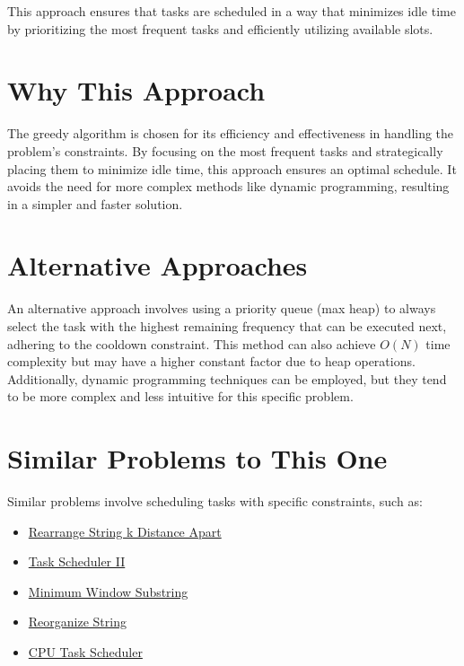 This approach ensures that tasks are scheduled in a way that minimizes idle time by prioritizing the most frequent tasks and efficiently utilizing available slots.

\section*{Why This Approach}

The greedy algorithm is chosen for its efficiency and effectiveness in handling the problem's constraints. By focusing on the most frequent tasks and strategically placing them to minimize idle time, this approach ensures an optimal schedule. It avoids the need for more complex methods like dynamic programming, resulting in a simpler and faster solution.

\section*{Alternative Approaches}

An alternative approach involves using a priority queue (max heap) to always select the task with the highest remaining frequency that can be executed next, adhering to the cooldown constraint. This method can also achieve \( O(N) \) time complexity but may have a higher constant factor due to heap operations. Additionally, dynamic programming techniques can be employed, but they tend to be more complex and less intuitive for this specific problem.

\section*{Similar Problems to This One}

Similar problems involve scheduling tasks with specific constraints, such as:

\begin{itemize}
    \item \hyperref[problem:rearrange_string_k_distance_apart]{Rearrange String k Distance Apart}
    \item \hyperref[problem:task_scheduler_ii]{Task Scheduler II}
    \item \hyperref[problem:minimum_window_substring]{Minimum Window Substring}
    \item \hyperref[problem:reorganize_string]{Reorganize String}
    \item \hyperref[problem:cpu_task_scheduler]{CPU Task Scheduler}
\end{itemize}

